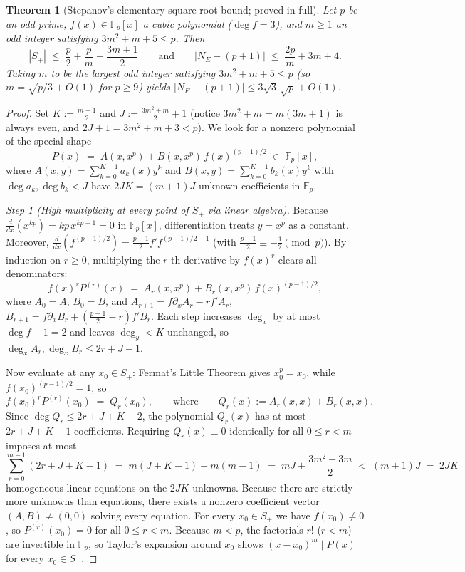 \documentclass[11pt]{amsart}
\newcommand{\FF}{\mathbb{F}}
\newtheorem{theorem}{Theorem}[section]
\theoremstyle{definition}
\theoremstyle{remark}
\begin{document}
\begin{theorem}[Stepanov's elementary square-root bound; proved in full]\label{thm:stepanov}
Let $p$ be an odd prime, $f(x)\in\FF_p[x]$ a cubic polynomial ($\deg f=3$), and $m\ge 1$ an odd integer satisfying $3m^2+m+5\le p$. Then
\begin{equation}\label{eq:stepanov}
 |S_+| \;\le\; \frac{p}{2}+\frac{p}{m}+\frac{3m+1}{2}
 \qquad\text{and}\qquad
 |N_E-(p+1)| \;\le\; \frac{2p}{m}+3m+4.
\end{equation}
Taking $m$ to be the largest odd integer satisfying $3m^2+m+5\le p$ (so $m=\sqrt{p/3}+O(1)$ for $p\ge 9$) yields $|N_E-(p+1)|\le 3\sqrt{3}\,\sqrt{p}+O(1)$.
\end{theorem}
\begin{proof}
Set $K:=\frac{m+1}{2}$ and $J:=\frac{3m^2+m}{2}+1$ (notice $3m^2+m=m(3m+1)$ is always even, and $2J+1=3m^2+m+3<p$). We look for a nonzero polynomial of the special shape
\[
 P(x) \;=\; A(x,x^p) + B(x,x^p)\,f(x)^{(p-1)/2} \;\in\; \FF_p[x],
\]
where $A(x,y)=\sum_{k=0}^{K-1}a_k(x)y^k$ and $B(x,y)=\sum_{k=0}^{K-1}b_k(x)y^k$ with $\deg a_k,\deg b_k<J$ have $2JK=(m+1)J$ unknown coefficients in $\FF_p$.

\emph{Step 1 (High multiplicity at every point of $S_+$ via linear algebra).} Because $\frac{d}{dx}(x^{kp})=kp\,x^{kp-1}=0$ in $\FF_p[x]$, differentiation treats $y=x^p$ as a constant. Moreover, $\frac{d}{dx}(f^{(p-1)/2})=\frac{p-1}{2}f'f^{(p-1)/2-1}$ (with $\frac{p-1}{2}\equiv-\frac12\pmod p$). By induction on $r\ge 0$, multiplying the $r$-th derivative by $f(x)^r$ clears all denominators:
\[
 f(x)^r P^{(r)}(x) \;=\; A_r(x,x^p) + B_r(x,x^p)\,f(x)^{(p-1)/2},
\]
where $A_0=A$, $B_0=B$, and $A_{r+1}=f\partial_x A_r-rf'A_r$, $B_{r+1}=f\partial_x B_r+(\frac{p-1}{2}-r)f'B_r$. Each step increases $\deg_x$ by at most $\deg f-1=2$ and leaves $\deg_y<K$ unchanged, so $\deg_x A_r,\deg_x B_r\le 2r+J-1$.

Now evaluate at any $x_0\in S_+$: Fermat's Little Theorem gives $x_0^p=x_0$, while $f(x_0)^{(p-1)/2}=1$, so
\[
 f(x_0)^r P^{(r)}(x_0) \;=\; Q_r(x_0), \qquad\text{where}\qquad Q_r(x):=A_r(x,x)+B_r(x,x).
\]
Since $\deg Q_r\le 2r+J+K-2$, the polynomial $Q_r(x)$ has at most $2r+J+K-1$ coefficients. Requiring $Q_r(x)\equiv 0$ identically for all $0\le r<m$ imposes at most
\[
 \sum_{r=0}^{m-1}(2r+J+K-1) \;=\; m(J+K-1)+m(m-1) \;=\; mJ+\frac{3m^2-3m}{2} \;<\; (m+1)J \;=\; 2JK
\]
homogeneous linear equations on the $2JK$ unknowns. Because there are strictly more unknowns than equations, there exists a nonzero coefficient vector $(A,B)\ne(0,0)$ solving every equation. For every $x_0\in S_+$ we have $f(x_0)\ne 0$, so $P^{(r)}(x_0)=0$ for all $0\le r<m$. Because $m<p$, the factorials $r!$ ($r<m$) are invertible in $\FF_p$, so Taylor's expansion around $x_0$ shows $(x-x_0)^m\mid P(x)$ for every $x_0\in S_+$.


\end{proof}
\end{document}
